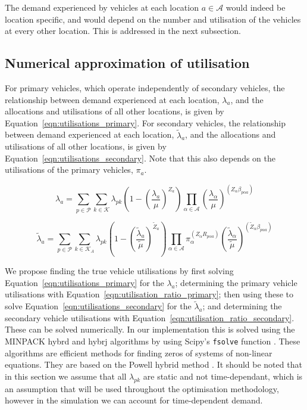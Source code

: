 \documentclass[numbers,webpdf,imaman]{ima-authoring-template}%
\begin{document}
The demand experienced by vehicles at each location $a \in \mathcal{A}$ would
indeed be location specific, and would depend on the number and utilisation of
the vehicles at every other location. This is addressed in the next subsection.


\subsection{Numerical approximation of utilisation}
For primary vehicles, which operate independently of secondary vehicles, the
relationship between demand experienced at each location, $\lambda_a$, and the
allocations and utilisations of all other locations, is given by
Equation~\ref{eqn:utilisations_primary}. For secondary vehicles, the
relationship between demand experienced at each location, $\tilde{\lambda}_a$,
and the allocations and utilisations of all other locations, is given by
Equation~\ref{eqn:utilisations_secondary}. Note that this also depends on the
utilisations of the primary vehicles, $\pi_a$.

\begin{equation}\label{eqn:utilisations_primary}
\lambda_a = \sum_{p \in \mathcal{P}} \sum_{k \in \mathcal{K}} \lambda_{pk}
\left( 1 - \left(\frac{\lambda_a}{\mu}\right)^{Z_a} \right)
\prod_{\alpha \in \mathcal{A}} \left(\frac{\lambda_{\alpha}}{\mu}\right)^{
\left(Z_{\alpha} \beta_{p \alpha a}\right)}
\end{equation}

\begin{equation}\label{eqn:utilisations_secondary}
\tilde{\lambda}_a = \sum_{p \in \mathcal{P}}
\sum_{k \in \mathcal{K}_A} \lambda_{pk}
\left( 1 - \left(\frac{\tilde{\lambda}_a}{\tilde{\mu}}\right)^{\tilde{Z}_a} \right)
\prod_{\alpha \in \mathcal{A}} \pi_{\alpha}^{\left(Z_{\alpha} R_{p \alpha a}\right)}
\left(\frac{\tilde{\lambda}_{\alpha}}{\tilde{\mu}}\right)^{
\left(\tilde{Z}_{\alpha} \beta_{p \alpha a}\right)}
\end{equation}


We propose finding the true vehicle utilisations by first solving
Equation~\ref{eqn:utilisations_primary} for the $\lambda_a$; determining the
primary vehicle utilisations with Equation~\ref{eqn:utilisation_ratio_primary};
then using these to solve Equation~\ref{eqn:utilisations_secondary} for the
$\tilde{\lambda}_a$; and determining the secondary vehicle utilisations with
Equation~\ref{eqn:utilisation_ratio_secondary}. These can be solved
numerically. In our implementation this is solved using the MINPACK hybrd and
hybrj algorithms by using Scipy's \texttt{fsolve} function
\citep{2020SciPy-NMeth}. These algorithms are efficient methods for finding zeros of systems of non-linear equations. 
They are based on the Powell hybrid method \citep{powell70}. It should be noted that in this section we assume that
all $\lambda_{pk}$ are static and not time-dependant, which is an assumption
that will be used throughout the optimisation methodology, however in the
simulation we can account for time-dependent demand.
\end{document}

